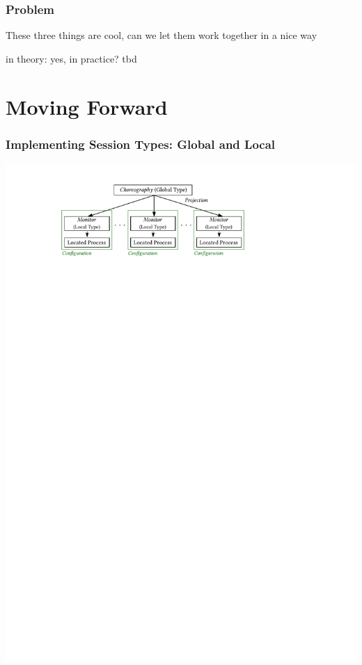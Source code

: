 \documentclass[12pt]{beamer}
\begin{document}
\begin{frame}[fragile]
\frametitle{Problem}
These three things are cool, can we let them work together in a nice way

in theory: yes, in practice? tbd
\end{frame}


\section{Moving Forward}

\begin{frame}[fragile]
\frametitle{Implementing Session Types: Global and Local}

\begin{center}
\includegraphics[scale=1.05]{figmodel}
\end{center}

\end{frame}
\end{document}
